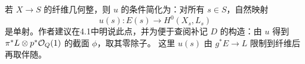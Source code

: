 若 \(X\to S\) 的纤维几何整，则 \(u\) 的条件简化为：对所有 \(s\in S\)，自然映射
\[
 u(s):E(s)\longrightarrow H^0(X_s,L_s)
\]
是单射。作者建议在4.1中明说此点，并为便于查阅补记 \(D\) 的构造：由 \(u\) 得到
\(\pi^*L\otimes p^*\mathcal O_Q(1)\) 的截面 \(\phi\)，取其零除子。
这里 \(u(s)\) 由 \(g^*E\to L\) 限制到纤维后再取伴随。
\par\endgroup

